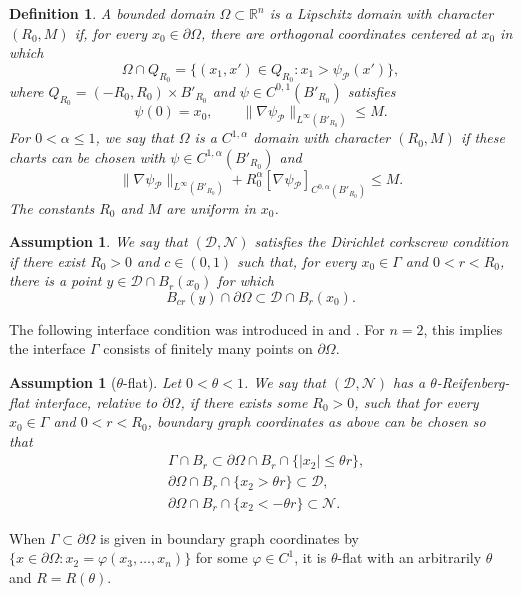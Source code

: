 \documentclass[12pt]{amsart}
\newtheorem{definition}[theorem]{Definition}
\newtheorem{assumption}[theorem]{Assumption}
\numberwithin{equation}{section}
\newcommand{\bR}{\mathbb{R}}
\newcommand\cD{\mathcal{D}}
\newcommand\cN{\mathcal{N}}
\newcommand{\p}{\partial}
\begin{document}
\begin{definition}
 A bounded domain $\Omega\subset\bR^n$ is a Lipschitz domain with character $(R_0,M)$ if, for every $x_0 \in\partial\Omega$, there are orthogonal coordinates centered at $x_0$ in which
 $$
  \Omega\cap Q_{R_0}
  =\bigl\{(x_1,x')\in Q_{R_0}:x_1>\psi_{\mathcal{P}}(x')\bigr\},
 $$
 where $Q_{R_0}=(-R_0,R_0)\times B'_{R_0}$ and $\psi\in C^{0,1}(B'_{R_0})$ satisfies
 $$
  \psi(0)=x_0,
  \qquad
  \|\nabla\psi_{\mathcal{P}}\|_{L^\infty(B'_{R_0})}\leq M.
 $$
 For $0<\alpha\leq1$, we say that $\Omega$ is a $C^{1,\alpha}$ domain with character $(R_0,M)$ if these charts can be chosen with $\psi\in C^{1,\alpha}(B'_{R_0})$ and
 $$
  \|\nabla\psi_{\mathcal{P}}\|_{L^\infty(B'_{R_0})}
  +R_0^\alpha[\nabla\psi_{\mathcal{P}}]_{C^{0,\alpha}(B'_{R_0})}
  \leq M.
 $$
 The constants $R_0$ and $M$ are uniform in $x_0$.
\end{definition}

\begin{assumption}\label{asp-cork}
    We say that $(\cD,\cN)$ satisfies the Dirichlet corkscrew condition if there exist $R_0>0$ and $c\in(0,1)$ such that, for every
 $x_0 \in\Gamma$ and $0<r<R_0$, there is a point
 $y\in\cD\cap B_r(x_0)$ for which
 $$
  B_{cr}(y) \cap \p \Omega \subset \cD\cap B_r(x_0).
 $$
\end{assumption}

The following interface condition was introduced in \cite{MR4261267} and \cite{MR4232502}. For $n=2$, this implies the interface $\Gamma$ consists of finitely many points on $\p\Omega$.
\begin{assumption}[$\theta$-flat]
  Let $0<\theta<1$. We say that $(\cD,\cN)$ has a $\theta$-Reifenberg-flat interface, relative to $\partial\Omega$, if there exists some $R_0 > 0$, such that for every $x_0 \in \Gamma$ and
 $0<r<R_0$, boundary graph coordinates as above can be chosen so that
 \begin{align}
  &\Gamma \cap B_r
   \subset\partial\Omega\cap B_r\cap\{|x_2|\leq\theta r\},
   \label{eq:RF1}\\
  &\partial\Omega\cap B_r\cap\{x_2>\theta r\}
   \subset\cD,
   \label{eq:RF2}\\
  &\partial\Omega\cap B_r\cap\{x_2<-\theta r\}
   \subset\cN.
   \label{eq:RF3}
 \end{align}
\end{assumption}

When $\Gamma \subset \p\Omega$ is given in boundary graph coordinates by $\{x \in \p\Omega: x_2 = \varphi(x_3,\ldots,x_n)\}$ for some $\varphi \in C^1$, it is $\theta$-flat with an arbitrarily $\theta$ and $R=R(\theta)$.
\end{document}
